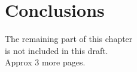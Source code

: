 \chapter{Conclusions}
\label{chap:conc}


\parbox[c][6cm][c]{\textwidth}{\LARGE
\centering
The remaining part of this chapter \\
is not included in this draft. 
\\
Approx 3 more pages.
} 